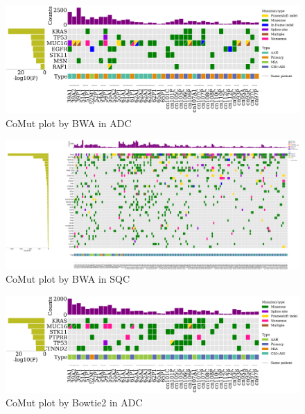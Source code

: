 \documentclass[a4paper]{article}
\begin{document}
                \begin{figure}[htbp]
                    \centering
                    \includegraphics[width=\linewidth]{figures/Mutect2/BWA-ADC.pdf}
                    \caption{CoMut plot by BWA in ADC}
                    \label{fig:comut-BWA-ADC}
                \end{figure}

                \begin{figure}[htbp]
                    \centering
                    \includegraphics[width=\linewidth]{figures/Mutect2/BWA-SQC.pdf}
                    \caption{CoMut plot by BWA in SQC}
                    \label{fig:comut-BWA-SQC}
                \end{figure}

                \begin{figure}[htbp]
                    \centering
                    \includegraphics[width=\linewidth]{figures/Mutect2/Bowtie2-ADC.pdf}
                    \caption{CoMut plot by Bowtie2 in ADC}
                    \label{fig:comut-Bowtie2-ADC}
                \end{figure}
\end{document}
